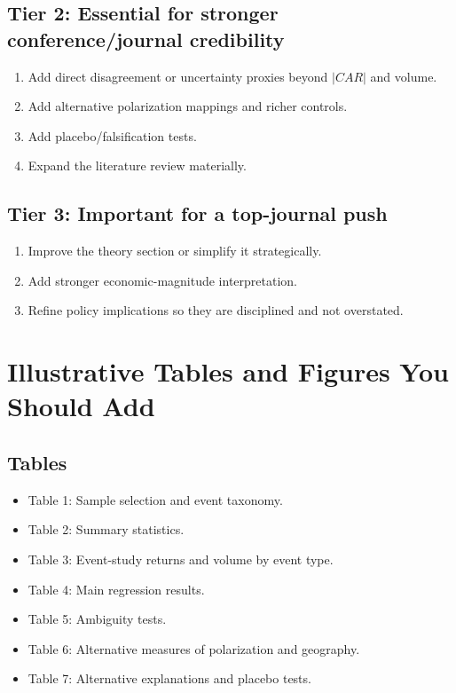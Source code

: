 \documentclass[12pt]{article}
\begin{document}
\subsection*{Tier 2: Essential for stronger conference/journal credibility}
\begin{enumerate}[leftmargin=2em]
    \item Add direct disagreement or uncertainty proxies beyond $|CAR|$ and volume.
    \item Add alternative polarization mappings and richer controls.
    \item Add placebo/falsification tests.
    \item Expand the literature review materially.
\end{enumerate}

\subsection*{Tier 3: Important for a top-journal push}
\begin{enumerate}[leftmargin=2em]
    \item Improve the theory section or simplify it strategically.
    \item Add stronger economic-magnitude interpretation.
    \item Refine policy implications so they are disciplined and not overstated.
\end{enumerate}

\section{Illustrative Tables and Figures You Should Add}
\subsection*{Tables}
\begin{itemize}[leftmargin=2em]
    \item Table 1: Sample selection and event taxonomy.
    \item Table 2: Summary statistics.
    \item Table 3: Event-study returns and volume by event type.
    \item Table 4: Main regression results.
    \item Table 5: Ambiguity tests.
    \item Table 6: Alternative measures of polarization and geography.
    \item Table 7: Alternative explanations and placebo tests.
\end{itemize}
\end{document}
